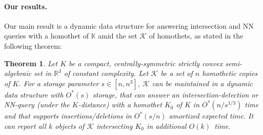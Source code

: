 \documentclass[11pt]{article}
\def\reals{{\mathbb R}}
\def\Kspace{{\mathbb K}}
\def\K{\mathcal{K}}
\newtheorem{theorem}{Theorem}[section]
\theoremstyle{definition}
\begin{document}
\paragraph{Our results.} 
Our main result is a dynamic data structure for answering intersection 
and NN queries with a homothet of $\Kspace$ amid the set $\K$ of homothets, as stated in the following theorem:
\fi
%

\begin{theorem} \label{thm:NN}
Let $K$ be a compact, centrally-symmetric strictly convex semi-algebraic set
in $\reals^3$ of constant complexity.  Let $\K$ be a set of $n$ homothetic 
copies of $K$. For a storage parameter $s \in [n,n^3]$, $\K$ can be maintained in a dynamic data 
	structure with $O^*(s)$ storage, that can answer an intersection-detection or NN-query (under the $K$-distance) 
	with a homothet $K_0$ of $K$ 
	in $O^*(n/s^{1/3})$ time and that supports insertions/deletions in $O^*(s/n)$ 
	amortized expected time. It can report all $k$ objects of $\K$ intersecting $K_0$ in additional $O(k)$~time.
\end{theorem}
\end{document}
